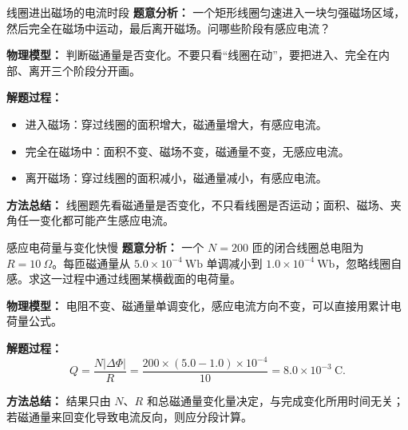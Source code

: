 \begin{examplebox}{线圈进出磁场的电流时段}
\textbf{题意分析：} 一个矩形线圈匀速进入一块匀强磁场区域，然后完全在磁场中运动，最后离开磁场。问哪些阶段有感应电流？

\textbf{物理模型：} 判断磁通量是否变化。不要只看“线圈在动”，要把进入、完全在内部、离开三个阶段分开画。

\begin{center}

\end{center}

\textbf{解题过程：}
\begin{itemize}
  \item 进入磁场：穿过线圈的面积增大，磁通量增大，有感应电流。
  \item 完全在磁场中：面积不变、磁场不变，磁通量不变，无感应电流。
  \item 离开磁场：穿过线圈的面积减小，磁通量减小，有感应电流。
\end{itemize}

\textbf{方法总结：} 线圈题先看磁通量是否变化，不只看线圈是否运动；面积、磁场、夹角任一变化都可能产生感应电流。
\end{examplebox}

\begin{examplebox}{感应电荷量与变化快慢}
\textbf{题意分析：} 一个 $N=200$ 匝的闭合线圈总电阻为 $R=10\ \Omega$。每匝磁通量从 $5.0\times10^{-4}\ \mathrm{Wb}$ 单调减小到 $1.0\times10^{-4}\ \mathrm{Wb}$，忽略线圈自感。求这一过程中通过线圈某横截面的电荷量。

\textbf{物理模型：} 电阻不变、磁通量单调变化，感应电流方向不变，可以直接用累计电荷量公式。

\textbf{解题过程：}
\[
Q=\frac{N|\Delta\Phi|}{R}
=\frac{200\times(5.0-1.0)\times10^{-4}}{10}
=8.0\times10^{-3}\ \mathrm C.
\]

\textbf{方法总结：} 结果只由 $N$、$R$ 和总磁通量变化量决定，与完成变化所用时间无关；若磁通量来回变化导致电流反向，则应分段计算。
\end{examplebox}

